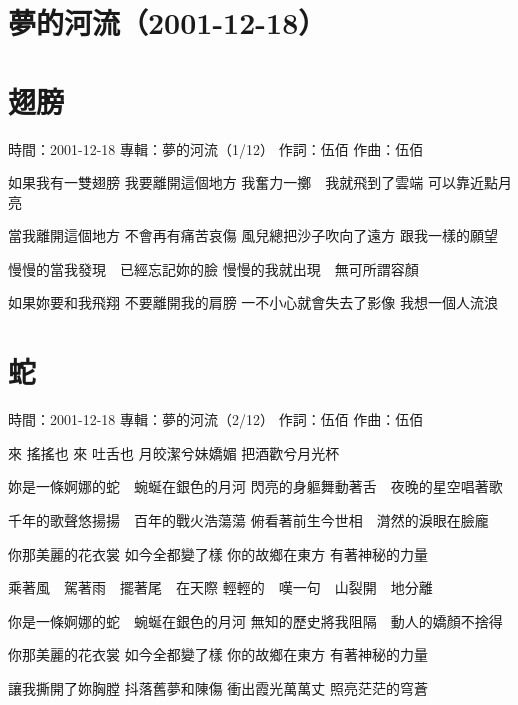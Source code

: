 \documentclass[UTF8,a4paper,oneside,twocolumn,12pt]{ctexbook}
\newcommand{\infopair}[2]{\textbullet #1：#2}
\newcommand{\zc}[1][伍佰]{\infopair{作詞}{#1}}
\newcommand{\zq}[1][伍佰]{\infopair{作曲}{#1}}
\newcommand{\zj}[1]{\infopair{專輯}{#1}}
\newcommand{\sj}[1]{\infopair{時間}{#1}}
\newenvironment{info}{\begin{flushleft}\kaishu
	}
	{\end{flushleft}\normalsize\yahei\par}
\newenvironment{lyric}{
	}
{}
\begin{document}
\section*{夢的河流（2001-12-18）}

\section{翅膀}
\begin{info}
	\sj{2001-12-18}
	\zj{夢的河流（1/12）}
	\zc
	\zq
\end{info}
\begin{lyric}
	如果我有一雙翅膀
	我要離開這個地方
	我奮力一擲　我就飛到了雲端
	可以靠近點月亮

	當我離開這個地方
	不會再有痛苦哀傷
	風兒總把沙子吹向了遠方
	跟我一樣的願望

	慢慢的當我發現　已經忘記妳的臉
	慢慢的我就出現　無可所謂容顏

	如果妳要和我飛翔
	不要離開我的肩膀
	一不小心就會失去了影像
	我想一個人流浪
\end{lyric}

\section{蛇}
\begin{info}
	\sj{2001-12-18}
	\zj{夢的河流（2/12）}
	\zc
	\zq
\end{info}
\begin{lyric}
	來 搖搖也
	來 吐舌也
	月皎潔兮妹嬌媚
	把酒歡兮月光杯

	妳是一條婀娜的蛇　蜿蜒在銀色的月河
	閃亮的身軀舞動著舌　夜晚的星空唱著歌

	千年的歌聲悠揚揚　百年的戰火浩蕩蕩
	俯看著前生今世相　潸然的淚眼在臉龐

	你那美麗的花衣裳
	如今全都變了樣
	你的故鄉在東方
	有著神秘的力量

	乘著風　駕著雨　擺著尾　在天際
	輕輕的　嘆一句　山裂開　地分離

	你是一條婀娜的蛇　蜿蜒在銀色的月河
	無知的歷史將我阻隔　動人的嬌顏不捨得

	你那美麗的花衣裳
	如今全都變了樣
	你的故鄉在東方
	有著神秘的力量

	讓我撕開了妳胸膛
	抖落舊夢和陳傷
	衝出霞光萬萬丈
	照亮茫茫的穹蒼
\end{lyric}
\end{document}
